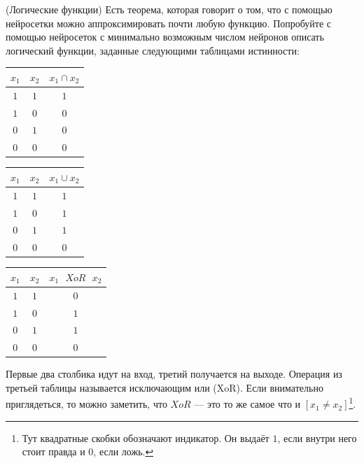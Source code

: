 \documentclass[12pt, a4paper, oneside]{article}
\theoremstyle{plain} %
\theoremstyle{definition}
\begin{document}
\begin{problem}{(Логические функции)}
Есть теорема, которая говорит о том, что с помощью нейросетки можно аппроксимировать почти любую функцию. Попробуйте с помощью нейросеток с минимально возможным числом нейронов описать логический функции, заданные следующими таблицами истинности:

\begin{center}
\begin{minipage}{0.3\linewidth} 
\begin{tabular}{c|c|c}
	$x_1$ & $x_2$ & $x_1 \cap x_2$ \\
	\hline 
	$1$ & $1$ & $1$ \\
	\hline 
	$1$ & $0$ & $0$ \\
	\hline 
	$0$ & $1$ & $0$ \\
	\hline 
	$0$ & $0$ & $0$ \\
\end{tabular}
\end{minipage}
\hfill
\begin{minipage}{0.3\linewidth}
		\begin{tabular}{c|c|c}
		$x_1$ & $x_2$ & $x_1 \cup x_2$ \\
		\hline 
		$1$ & $1$ & $1$ \\
		\hline 
		$1$ & $0$ & $1$ \\
		\hline 
		$0$ & $1$ & $1$ \\
		\hline 
		$0$ & $0$ & $0$ \\
	\end{tabular}
\end{minipage}
\hfill
\begin{minipage}{0.3\linewidth}
		\begin{tabular}{c|c|c}
		$x_1$ & $x_2$ & $x_1 \mbox{ } XoR \mbox{ } x_2$ \\
		\hline 
		$1$ & $1$ & $0$ \\
		\hline 
		$1$ & $0$ & $1$ \\
		\hline 
		$0$ & $1$ & $1$ \\
		\hline 
		$0$ & $0$ & $0$ \\
	\end{tabular}
\end{minipage}
\end{center}

Первые два столбика идут на вход, третий получается на выходе.  Операция из третьей таблицы называется исключающим или (XoR). Если внимательно приглядеться, то можно заметить, что $XoR$ --- это то же самое что и $[x_1 \ne x_2]$\footnote{Тут квадратные скобки обозначают индикатор. Он выдаёт $1$, если внутри него стоит правда и $0$, если ложь.}. 
\end{problem}
\end{document}
